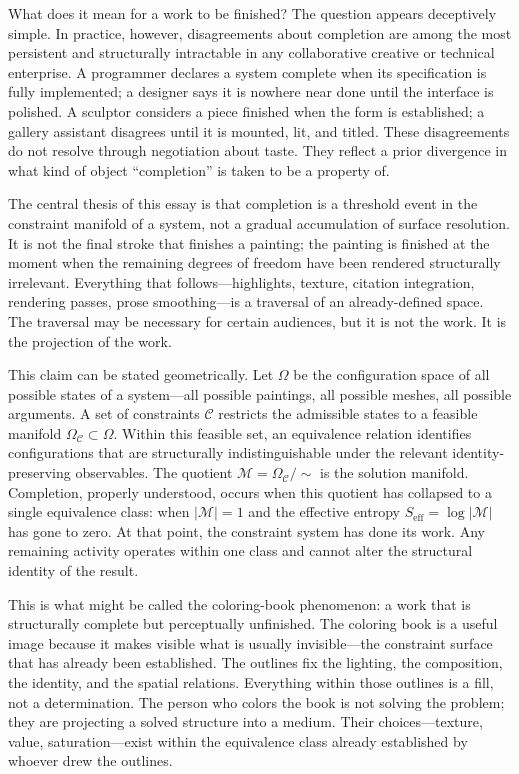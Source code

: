 \documentclass[11pt, twoside]{article}
\theoremstyle{plain}
\theoremstyle{definition}
\theoremstyle{remark}
\newcommand{\OmC}{\Omega_{\mathcal{C}}}
\newcommand{\Seff}{S_{\text{eff}}}
\begin{document}
What does it mean for a work to be finished? The question appears deceptively simple. In practice, however, disagreements about completion are among the most persistent and structurally intractable in any collaborative creative or technical enterprise. A programmer declares a system complete when its specification is fully implemented; a designer says it is nowhere near done until the interface is polished. A sculptor considers a piece finished when the form is established; a gallery assistant disagrees until it is mounted, lit, and titled. These disagreements do not resolve through negotiation about taste. They reflect a prior divergence in what kind of object ``completion'' is taken to be a property of.

The central thesis of this essay is that completion is a threshold event in the constraint manifold of a system, not a gradual accumulation of surface resolution. It is not the final stroke that finishes a painting; the painting is finished at the moment when the remaining degrees of freedom have been rendered structurally irrelevant. Everything that follows---highlights, texture, citation integration, rendering passes, prose smoothing---is a traversal of an already-defined space. The traversal may be necessary for certain audiences, but it is not the work. It is the projection of the work.

This claim can be stated geometrically. Let $\Omega$ be the configuration space of all possible states of a system---all possible paintings, all possible meshes, all possible arguments. A set of constraints $\mathcal{C}$ restricts the admissible states to a feasible manifold $\OmC \subset \Omega$. Within this feasible set, an equivalence relation identifies configurations that are structurally indistinguishable under the relevant identity-preserving observables. The quotient $\mathcal{M} = \OmC / {\sim}$ is the solution manifold. Completion, properly understood, occurs when this quotient has collapsed to a single equivalence class: when $|\mathcal{M}| = 1$ and the effective entropy $\Seff = \log |\mathcal{M}|$ has gone to zero. At that point, the constraint system has done its work. Any remaining activity operates within one class and cannot alter the structural identity of the result.

This is what might be called the coloring-book phenomenon: a work that is structurally complete but perceptually unfinished. The coloring book is a useful image because it makes visible what is usually invisible---the constraint surface that has already been established. The outlines fix the lighting, the composition, the identity, and the spatial relations. Everything within those outlines is a fill, not a determination. The person who colors the book is not solving the problem; they are projecting a solved structure into a medium. Their choices---texture, value, saturation---exist within the equivalence class already established by whoever drew the outlines.
\end{document}
